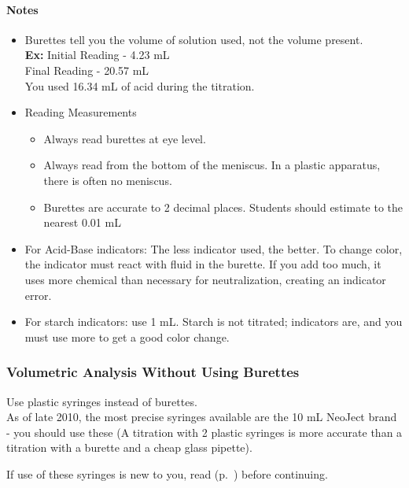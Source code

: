 \paragraph{Notes}
\begin{itemize}
\item Burettes tell you the volume of solution used, not the volume present.\\
\textbf{Ex:} Initial Reading - 4.23 mL\\
Final Reading - 20.57 mL\\
You used 16.34 mL of acid during the titration.

\item Reading Measurements
	\begin{itemize} 
	\item Always read burettes at eye level.
	\item Always read from the bottom of the meniscus. In a plastic apparatus, there is often no meniscus.
	\item Burettes are accurate to 2 decimal places. Students should estimate to the nearest 0.01 mL
	\end{itemize}

\item For Acid-Base indicators: The less indicator used, the better. To change color, the indicator must react with fluid in the burette. If you add too much, it uses more chemical than necessary for neutralization, creating an indicator error.
		
\item For starch indicators: use 1 mL. Starch is not titrated; indicators are, and you must use more to get a good color change.

\end{itemize}




\subsubsection{Volumetric Analysis Without Using Burettes}

Use plastic syringes instead of burettes.\\

As of late 2010, the most precise syringes available are the 10 mL NeoJect brand - you should use these
(A titration with 2 plastic syringes is more accurate than a titration with a burette and a cheap glass pipette).

If use of these syringes is new to you, read  (p.~\pageref{cha:usesyringe}) before continuing.\\

